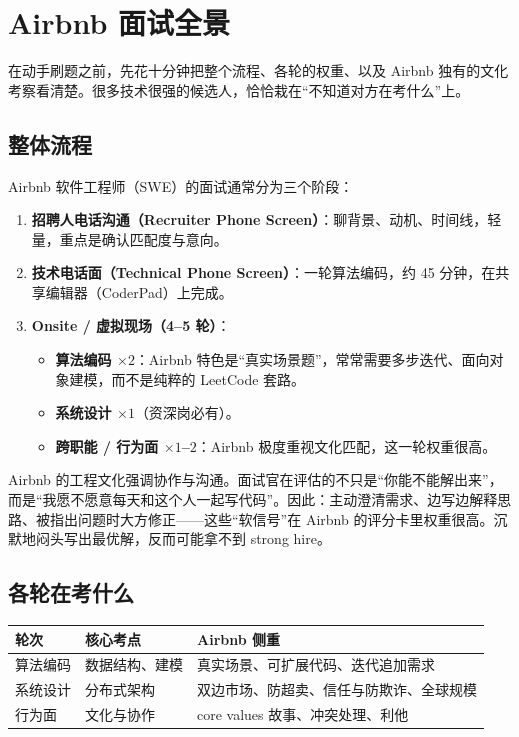 \chapter{Airbnb 面试全景}

在动手刷题之前，先花十分钟把整个流程、各轮的权重、以及 Airbnb 独有的文化考察看清楚。很多技术很强的候选人，恰恰栽在“不知道对方在考什么”上。

\section{整体流程}

Airbnb 软件工程师（SWE）的面试通常分为三个阶段：

\begin{enumerate}
  \item \textbf{招聘人电话沟通（Recruiter Phone Screen）}：聊背景、动机、时间线，轻量，重点是确认匹配度与意向。
  \item \textbf{技术电话面（Technical Phone Screen）}：一轮算法编码，约 45 分钟，在共享编辑器（CoderPad）上完成。
  \item \textbf{Onsite / 虚拟现场（4--5 轮）}：
  \begin{itemize}
    \item \textbf{算法编码 $\times 2$}：Airbnb 特色是“真实场景题”，常常需要多步迭代、面向对象建模，而不是纯粹的 LeetCode 套路。
    \item \textbf{系统设计 $\times 1$}（资深岗必有）。
    \item \textbf{跨职能 / 行为面 $\times 1$--$2$}：Airbnb 极度重视文化匹配，这一轮权重很高。
  \end{itemize}
\end{enumerate}

\begin{idea}
Airbnb 的工程文化强调协作与沟通。面试官在评估的不只是“你能不能解出来”，而是“我愿不愿意每天和这个人一起写代码”。因此：主动澄清需求、边写边解释思路、被指出问题时大方修正——这些“软信号”在 Airbnb 的评分卡里权重很高。沉默地闷头写出最优解，反而可能拿不到 strong hire。
\end{idea}

\section{各轮在考什么}

\begin{center}
\begin{tabularx}{\linewidth}{@{}l l X@{}}
\toprule
\textbf{轮次} & \textbf{核心考点} & \textbf{Airbnb 侧重} \\
\midrule
算法编码 & 数据结构、建模 & 真实场景、可扩展代码、迭代追加需求 \\
系统设计 & 分布式架构 & 双边市场、防超卖、信任与防欺诈、全球规模 \\
行为面 & 文化与协作 & core values 故事、冲突处理、利他 \\
\bottomrule
\end{tabularx}
\end{center}

